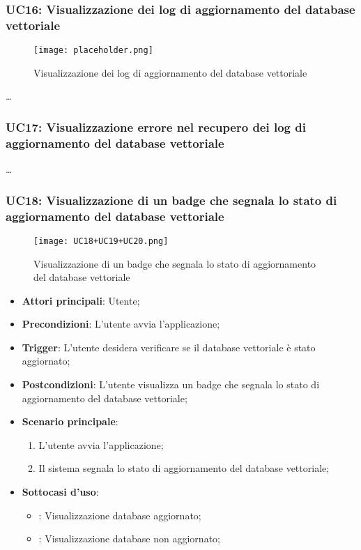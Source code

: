 \hypertarget{UC16}{}
\subsubsection{UC16: Visualizzazione dei log di aggiornamento del database vettoriale}

\begin{figure}[h]
    \centering
    \texttt{[image: placeholder.png]}
    \caption{Visualizzazione dei log di aggiornamento del database vettoriale}
\end{figure}

\dots

\hypertarget{UC17}{}
\subsubsection{UC17: Visualizzazione errore nel recupero dei log di aggiornamento del database vettoriale}
\dots

\newpage

\hypertarget{UC18}{}
\subsubsection{UC18: Visualizzazione di un badge che segnala lo stato di aggiornamento del database vettoriale}

\begin{figure}[h]
    \centering
    \texttt{[image: UC18+UC19+UC20.png]}
    \caption{Visualizzazione di un badge che segnala lo stato di aggiornamento del database vettoriale}
\end{figure}

\begin{itemize}
    \item \textbf{Attori principali}: Utente;
    \item \textbf{Precondizioni}: L'utente avvia l'applicazione;
    \item \textbf{Trigger}: L'utente desidera verificare se il database vettoriale è stato aggiornato;
    \item \textbf{Postcondizioni}: L'utente visualizza un badge che segnala lo stato di aggiornamento del database vettoriale;
    \item \textbf{Scenario principale}:
    \begin{enumerate}
        \item L'utente avvia l'applicazione;
        \item Il sistema segnala lo stato di aggiornamento del database vettoriale;
    \end{enumerate}
    \item \textbf{Sottocasi d'uso}:
    \begin{itemize}
        \item {}: Visualizzazione database aggiornato;
        \item {}: Visualizzazione database non aggiornato;
    \end{itemize}
\end{itemize}

